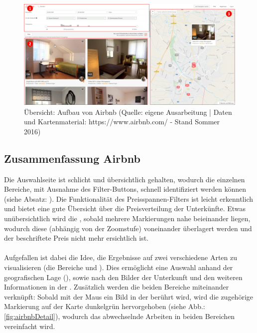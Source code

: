 \documentclass[../Bachelorarbeit.tex]{subfiles}
\begin{document}
\begin{figure}[H]
	\centering
	\includegraphics[width=1\linewidth]{img/StandDerTechnik/airbnbOverview}
	\caption[Übersicht: Aufbau von Airbnb]{Übersicht: Aufbau von Airbnb (Quelle: eigene Ausarbeitung | Daten und Kartenmaterial: https://www.airbnb.com/ - Stand Sommer 2016)}
	\label{fig:airbnbOverview}
\end{figure}

\subsection{Zusammenfassung Airbnb}
\label{airbnb:review}
Die Auswahlseite ist schlicht und übersichtlich gehalten, wodurch die einzelnen Bereiche, mit Ausnahme des Filter-Buttons, schnell identifiziert werden können (siehe Absatz: ). 
Die Funktionalität des Preisspannen-Filters ist leicht erkenntlich und bietet eine gute Übersicht über die Preisverteilung der Unterkünfte.
Etwas unübersichtlich wird die , sobald mehrere Markierungen nahe beieinander liegen, wodurch diese (abhängig von der Zoomstufe) voneinander überlagert werden und der beschriftete Preis nicht mehr ersichtlich ist. \\
\\
Aufgefallen ist dabei die Idee, die Ergebnisse auf zwei verschiedene Arten zu visualisieren (die Bereiche  und ).
Dies ermöglicht eine Auswahl anhand der geografischen Lage (), sowie nach den Bilder der Unterkunft und den weiteren Informationen in der .
Zusätzlich werden die beiden Bereiche miteinander verknüpft: Sobald mit der Maus ein Bild in der  berührt wird, wird die zugehörige Markierung auf der Karte dunkelgrün hervorgehoben (siehe Abb.: \ref{fig:airbnbDetail}), wodurch das abwechselnde Arbeiten in beiden Bereichen vereinfacht wird.
\end{document}
